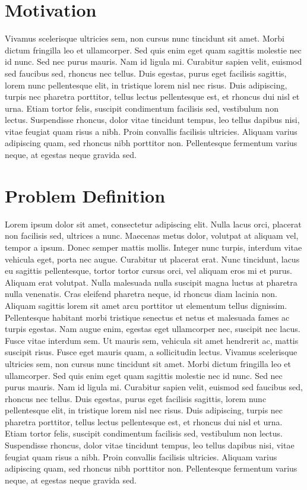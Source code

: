 \documentclass[12pt,a4paper,titlepage]{report}
\begin{document}
\section{Motivation}
Vivamus scelerisque ultricies sem, non cursus nunc tincidunt sit amet. Morbi dictum fringilla leo et ullamcorper. Sed quis enim eget quam sagittis molestie nec id nunc. Sed nec purus mauris. Nam id ligula mi. Curabitur sapien velit, euismod sed faucibus sed, rhoncus nec tellus. Duis egestas, purus eget facilisis sagittis, lorem nunc pellentesque elit, in tristique lorem nisl nec risus. Duis adipiscing, turpis nec pharetra porttitor, tellus lectus pellentesque est, et rhoncus dui nisl et urna. Etiam tortor felis, suscipit condimentum facilisis sed, vestibulum non lectus. Suspendisse rhoncus, dolor vitae tincidunt tempus, leo tellus dapibus nisi, vitae feugiat quam risus a nibh. Proin convallis facilisis ultricies. Aliquam varius adipiscing quam, sed rhoncus nibh porttitor non. Pellentesque fermentum varius neque, at egestas neque gravida sed.

\section{Problem Definition}
Lorem ipsum dolor sit amet, consectetur adipiscing elit. Nulla lacus orci, placerat non facilisis sed, ultrices a nunc. Maecenas metus dolor, volutpat at aliquam vel, tempor a ipsum. Donec semper mattis mollis. Integer nunc turpis, interdum vitae vehicula eget, porta nec augue. Curabitur ut placerat erat. Nunc tincidunt, lacus eu sagittis pellentesque, tortor tortor cursus orci, vel aliquam eros mi et purus. Aliquam erat volutpat. Nulla malesuada nulla suscipit magna luctus at pharetra nulla venenatis. Cras eleifend pharetra neque, id rhoncus diam lacinia non. Aliquam sagittis lorem sit amet arcu porttitor ut elementum tellus dignissim. Pellentesque habitant morbi tristique senectus et netus et malesuada fames ac turpis egestas. Nam augue enim, egestas eget ullamcorper nec, suscipit nec lacus. Fusce vitae interdum sem. Ut mauris sem, vehicula sit amet hendrerit ac, mattis suscipit risus. Fusce eget mauris quam, a sollicitudin lectus.
Vivamus scelerisque ultricies sem, non cursus nunc tincidunt sit amet. Morbi dictum fringilla leo et ullamcorper. Sed quis enim eget quam sagittis molestie nec id nunc. Sed nec purus mauris. Nam id ligula mi. Curabitur sapien velit, euismod sed faucibus sed, rhoncus nec tellus. Duis egestas, purus eget facilisis sagittis, lorem nunc pellentesque elit, in tristique lorem nisl nec risus. Duis adipiscing, turpis nec pharetra porttitor, tellus lectus pellentesque est, et rhoncus dui nisl et urna. Etiam tortor felis, suscipit condimentum facilisis sed, vestibulum non lectus. Suspendisse rhoncus, dolor vitae tincidunt tempus, leo tellus dapibus nisi, vitae feugiat quam risus a nibh. Proin convallis facilisis ultricies. Aliquam varius adipiscing quam, sed rhoncus nibh porttitor non. Pellentesque fermentum varius neque, at egestas neque gravida sed.
\end{document}
